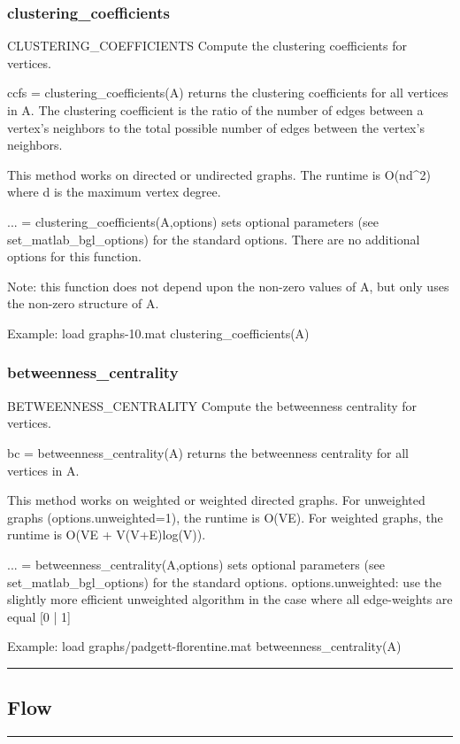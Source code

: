 \subsubsection*{clustering\_coefficients}
\begin{mcode}
  CLUSTERING_COEFFICIENTS Compute the clustering coefficients for vertices.
 
  ccfs = clustering_coefficients(A) returns the clustering coefficients for
  all vertices in A.  The clustering coefficient is the ratio of the number
  of edges between a vertex's neighbors to the total possible number of 
  edges between the vertex's neighbors. 
 
  This method works on directed or undirected graphs.
  The runtime is O(nd^2) where d is the maximum vertex degree.
 
  ... = clustering_coefficients(A,options) sets optional parameters (see 
  set_matlab_bgl_options) for the standard options.
    There are no additional options for this function.
 
  Note: this function does not depend upon the non-zero values of A, but
  only uses the non-zero structure of A.
 
  Example:
     load graphs\clique-10.mat
     clustering_coefficients(A)
\end{mcode}
\newpage
\subsubsection*{betweenness\_centrality}
\begin{mcode}
  BETWEENNESS_CENTRALITY Compute the betweenness centrality for vertices.
 
  bc = betweenness_centrality(A) returns the betweenness centrality for
  all vertices in A.  
 
  This method works on weighted or weighted directed graphs.
  For unweighted graphs (options.unweighted=1), the runtime is O(VE).
  For weighted graphs, the runtime is O(VE + V(V+E)log(V)).
 
  ... = betweenness_centrality(A,options) sets optional parameters (see 
  set_matlab_bgl_options) for the standard options.
    options.unweighted: use the slightly more efficient unweighted
      algorithm in the case where all edge-weights are equal [{0} | 1]  
 
  Example:
     load graphs/padgett-florentine.mat
     betweenness_centrality(A)
\end{mcode}
\newpage
\hrule
\subsection*{Flow}
\vspace{1cm}
\hrule

